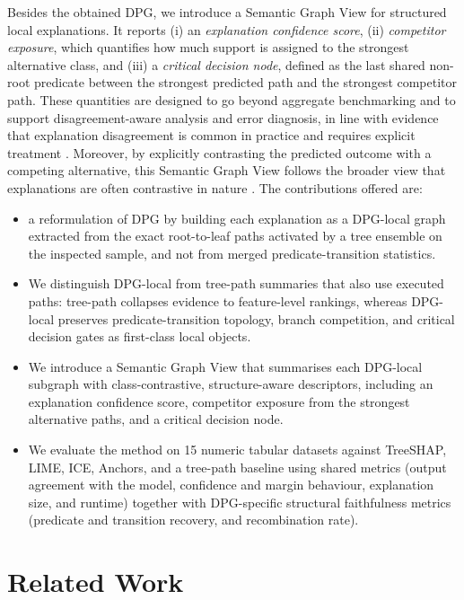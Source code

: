 \documentclass[runningheads]{llncs}
\begin{document}
Besides the obtained DPG, we introduce a Semantic Graph View for structured local explanations. It reports (i) an \emph{explanation confidence score}, (ii) \emph{competitor exposure}, which quantifies how much support is assigned to the strongest alternative class, and (iii) a \emph{critical decision node}, defined as the last shared non-root predicate between the strongest predicted path and the strongest competitor path. 
These quantities are designed to go beyond aggregate benchmarking and to support disagreement-aware analysis and error diagnosis, in line with evidence that explanation disagreement is common in practice and requires explicit treatment \cite{krishna2022disagreement}. 
Moreover, by explicitly contrasting the predicted outcome with a competing alternative, this Semantic Graph View follows the broader view that explanations are often contrastive in nature \cite{miller2019explanation}. 
The contributions offered are:
\begin{itemize}
  \item a reformulation of DPG by building each explanation as a DPG-local graph extracted from the exact root-to-leaf paths activated by a tree ensemble on the inspected sample, and not from merged predicate-transition statistics.
  \item We distinguish DPG-local from tree-path summaries that also use executed paths: tree-path collapses evidence to feature-level rankings, whereas DPG-local preserves predicate-transition topology, branch competition, and critical decision gates as first-class local objects.
  \item We introduce a Semantic Graph View that summarises each DPG-local subgraph with class-contrastive, structure-aware descriptors, including an explanation confidence score, competitor exposure from the strongest alternative paths, and a critical decision node.
  \item We evaluate the method on 15 numeric tabular datasets against TreeSHAP, LIME, ICE, Anchors, and a tree-path baseline using shared metrics (output agreement with the model, confidence and margin behaviour, explanation size, and runtime) together with DPG-specific structural faithfulness metrics (predicate and transition recovery, and recombination rate).
\end{itemize}


\section{Related Work}
\end{document}
